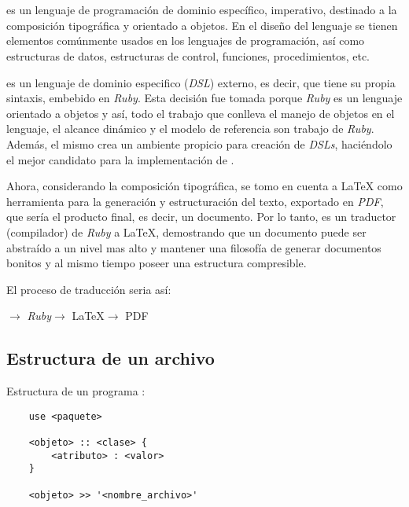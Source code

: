 \documentclass[12pt,letterpaper,titlepage,oneside,openright]{book}
\newcommand{\OhTeX}{%
    \makebox[0.76em][c]{O}%
    \makebox[0.25em][c]{%
        \raisebox{0.14em}[0em][0em]{%
            \fontsize{0.5em}{0cm}%
                \selectfont H%
        }%
    }%
    \makebox[1.35em][c]{\TeX}%
}
\newcommand{\latex}{\LaTeX\xspace}
\newcommand{\ohtex}{\OhTeX\xspace}
\newcommand{\ruby}{\textit{Ruby}\xspace}
\begin{document}
\chapter[OhTeX]{\ohtex}

\ohtex es un lenguaje de programación de dominio específico, imperativo,
destinado a la composición tipográfica y orientado a objetos. En el diseño del
lenguaje se tienen elementos comúnmente usados en los lenguajes de programación,
así como estructuras de datos, estructuras de control, funciones,
procedimientos, etc.

\ohtex es un lenguaje de dominio especifico (\textit{DSL}) externo, es decir,
que tiene su propia sintaxis, embebido en \ruby. Esta decisión fue tomada porque
\ruby es un lenguaje orientado a objetos y así, todo el trabajo que conlleva el
manejo de objetos en el lenguaje, el alcance dinámico y el modelo de referencia
son trabajo de \ruby. Además, el mismo crea un ambiente propicio para creación de
\textit{DSLs}, haciéndolo el mejor candidato para la implementación de \ohtex.

Ahora, considerando la composición tipográfica, se tomo en cuenta a \latex como
herramienta para la generación y estructuración del texto, exportado en
\textit{PDF}, que sería el producto final, es decir, un documento. Por lo tanto,
\ohtex es un traductor (compilador) de \ruby a \latex, demostrando que un
documento puede ser abstraído a un nivel mas alto y mantener una filosofía de
generar documentos bonitos y al mismo tiempo poseer una estructura compresible.

El proceso de traducción seria así:

\begin{center}
    \ohtex $\longrightarrow$ \ruby $\longrightarrow$ \latex $\longrightarrow$ PDF
\end{center}

\section[Estructura de un archivo OhTeX]{Estructura de un archivo \ohtex}

Estructura de un programa \ohtex:

\begin{center}
\begin{lstlisting}
    use <paquete>

    <objeto> :: <clase> {
        <atributo> : <valor> 
    }

    <objeto> >> '<nombre_archivo>'
\end{lstlisting}
\end{center}
\end{document}
